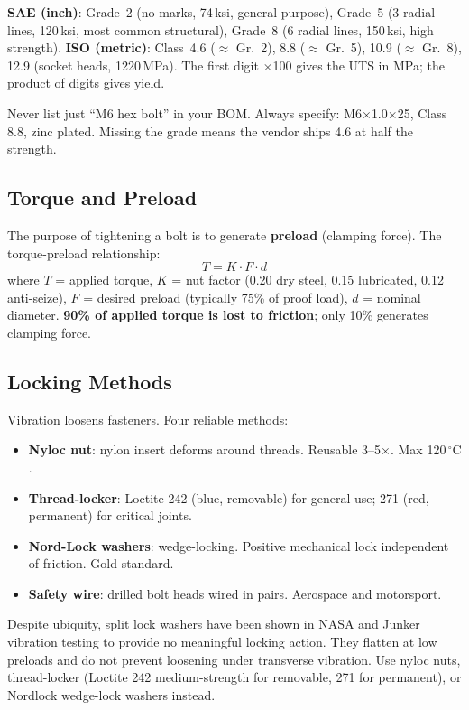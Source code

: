 \documentclass[11pt,letterpaper,twoside,openany]{book}
\newcommand{\degC}{\ensuremath{{}^{\circ}\text{C}}}
\begin{document}
\textbf{SAE (inch)}: Grade~2 (no marks, 74\,ksi, general purpose), Grade~5 (3 radial lines, 120\,ksi, most common structural), Grade~8 (6 radial lines, 150\,ksi, high strength). \textbf{ISO (metric)}: Class~4.6 ($\approx$ Gr.~2), 8.8 ($\approx$ Gr.~5), 10.9 ($\approx$ Gr.~8), 12.9 (socket heads, 1220\,MPa). The first digit $\times$100 gives the UTS in MPa; the product of digits gives yield.

\begin{tipbox}
Never list just ``M6 hex bolt'' in your BOM. Always specify: M6$\times$1.0$\times$25, Class 8.8, zinc plated. Missing the grade means the vendor ships 4.6 at half the strength.
\end{tipbox}

\subsection{Torque and Preload}
The purpose of tightening a bolt is to generate \textbf{preload} (clamping force). The torque-preload relationship:
\begin{equation}
T = K \cdot F \cdot d
\end{equation}
where $T$ = applied torque, $K$ = nut factor (0.20 dry steel, 0.15 lubricated, 0.12 anti-seize), $F$ = desired preload (typically 75\% of proof load), $d$ = nominal diameter. \textbf{90\% of applied torque is lost to friction}; only 10\% generates clamping force.

\subsection{Locking Methods}
Vibration loosens fasteners. Four reliable methods:
\begin{itemize}[nosep,leftmargin=1.5em]
\item \textbf{Nyloc nut}: nylon insert deforms around threads. Reusable 3--5$\times$. Max 120\,\degC{}.
\item \textbf{Thread-locker}: Loctite 242 (blue, removable) for general use; 271 (red, permanent) for critical joints.
\item \textbf{Nord-Lock washers}: wedge-locking. Positive mechanical lock independent of friction. Gold standard.
\item \textbf{Safety wire}: drilled bolt heads wired in pairs. Aerospace and motorsport.
\end{itemize}

\begin{warningbox}
Despite ubiquity, split lock washers have been shown in NASA and Junker vibration testing to provide no meaningful locking action. They flatten at low preloads and do not prevent loosening under transverse vibration. Use nyloc nuts, thread-locker (Loctite 242 medium-strength for removable, 271 for permanent), or Nordlock wedge-lock washers instead.
\end{warningbox}
\end{document}
